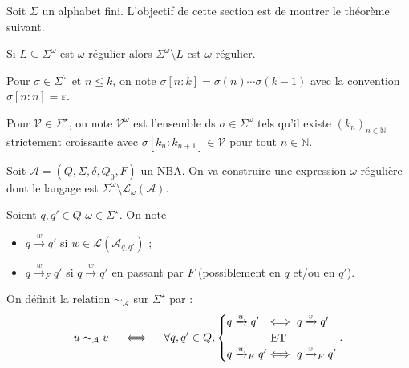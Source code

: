 \documentclass[./main]{subfiles}
\begin{document}
  Soit $\Sigma$ un alphabet fini. L'objectif de cette section est de montrer le théorème suivant.

  \begingroup
  \def\thethm{\ref{thm:buchi-compl}}
  \begin{thm}[Büchi]
    Si $L \subseteq \Sigma^\omega$ est $\omega$-régulier alors $\Sigma^\omega \setminus L$ est $\omega$-régulier.
  \end{thm}
  \addtocounter{thm}{-1}
  \endgroup

  \begin{nota}
    Pour $\sigma \in \Sigma^\omega$ et $n \le k$, on note $\sigma[n : k] = \sigma(n) \cdots \sigma(k-1)$ avec la convention $\sigma[n : n] = \varepsilon$.
  \end{nota}

  \begin{nota}
    Pour $\mathcal{V} \in \Sigma^\star$, on note $\mathcal{V}^\omega$ est l'ensemble ds $\sigma \in \Sigma^\omega$ tels qu'il existe $(k_n)_{n \in \mathds{N}}$ strictement  croissante avec $\sigma[k_n : k_{n+1}] \in \mathcal{V}$ pour tout $n \in \mathds{N}$.
  \end{nota}

  Soit $\mathcal{A} = (Q, \Sigma, \delta, Q_0, F)$ un NBA. On va construire une expression $\omega$-régulière dont le langage est $\Sigma^\omega \setminus \mathcal{L}_\omega(\mathcal{A})$.


  \begin{nota}
    Soient $q, q' \in Q$ $\omega \in \Sigma^\star$. On note
    \begin{itemize}
      \item $q \xrightarrow{w} q'$ si $w \in \mathcal{L}(\mathcal{A}_{q, q'})$ ;
      \item $q \xrightarrow{w}_F q'$ si $q \xrightarrow{w} q'$ en passant par $F$ (possiblement en $q$ et/ou en $q'$).
    \end{itemize}
  \end{nota}

  \begin{defn}
    On définit la relation $\sim_\mathcal{A}$ sur $\Sigma^\star$ par :
     \[
    u \sim_\mathcal{A} v \quad \iff \quad \forall q, q' \in Q,
    \begin{cases}
      q \xrightarrow u q'\hspace{-1em} &\iff q \xrightarrow v q' \\
      &\ \text{ET}\\
      q \xrightarrow u_F q'\hspace{-1em} &\iff q \xrightarrow v_F q' \\
    \end{cases}
    .\]
  \end{defn}
\end{document}
